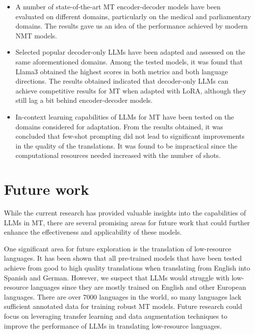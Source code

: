 \documentclass[11pt,english,listoffigures,listoftables]{tfgetsinf}
\begin{document}
\begin{itemize}
    \item A number of state-of-the-art MT encoder-decoder models have been evaluated on different domains, particularly on the medical and parliamentary domains. The results gave us an idea of the performance achieved by modern NMT models. 

    \item Selected popular decoder-only LLMs have been adapted and assessed on the same aforementioned domains. Among the tested models, it was found that Llama3 obtained the highest scores in both metrics and both language directions. The results obtained indicated that decoder-only LLMs can achieve competitive results for MT when adapted with LoRA, although they still lag a bit behind encoder-decoder models.
    
    

    \item In-context learning capabilities of LLMs for MT have been tested on the domains considered for adaptation. From the results obtained, it was concluded that few-shot prompting did not lead to significant improvements in the quality of the translations. It was found to be impractical since the computational resources needed increased with the number of shots.
\end{itemize}


\section{Future work}

While the current research has provided valuable insights into the capabilities of LLMs in MT, there are several promising areas for future work that could further enhance the effectiveness and applicability of these models.

One significant area for future exploration is the translation of low-resource languages. It has been shown that all pre-trained models that have been tested achieve from good to high quality translations when translating from English into Spanish and German. However, we suspect that LLMs would struggle with low-resource languages since they are mostly trained on English and other European languages. There are over 7000 languages in the world, so many languages lack sufficient annotated data for training robust MT models. Future research could focus on leveraging transfer learning and data augmentation techniques to improve the performance of LLMs in translating low-resource languages. 
    
\end{document}
